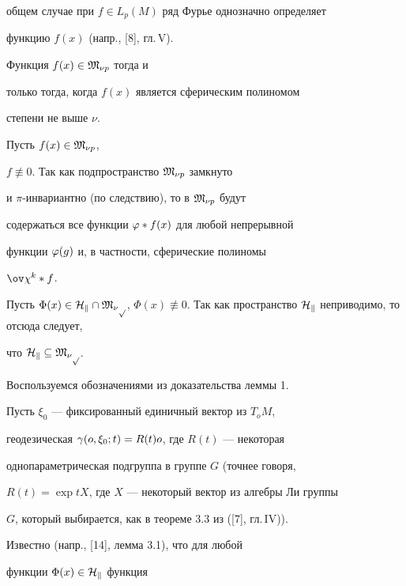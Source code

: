общем случае при $f\in L_p(M)$ ряд Фурье однозначно определяет


функцию $f(x)$ (напр., [8], гл.\,V).





\begin{thm}


Функция $f(x)\in\frak M_{\nu p}$ тогда и


только тогда, когда $f(x)$ является сферическим полиномом


степени не выше $\nu$.


\end{thm}





\begin{pf}


Пусть $f(x)\in\frak M_{\nu p}$,


$f\not\equiv 0$. Так как подпространство $\frak M_{\nu p}$ замкнуто


и $\pi$-инвариантно (по следствию), то в $\frak M_{\nu p}$ будут


содержаться все функции $\varphi*f(x)$ для любой непрерывной


функции $\varphi(g)$ и, в частности, сферические полиномы


$\ov\chi{}^k*f$.





Пусть $\Phi(x)\in\Hc_k\cap\Mg_{\nu p}$, $\Phi(x)\not\equiv


0$. Так как пространство $\Hc_k$ неприводимо, то отсюда следует,


что $\cal H_k\subseteq\frak M_{\nu p}$.





Воспользуемся обозначениями из доказательства леммы 1.


Пусть $\xi_0$ --- фиксированный единичный вектор из $T_oM$,


геодезическая $\gamma(o,\xi_0;t)=R(t)o$, где $R(t)$ --- некоторая


однопараметрическая подгруппа в группе $G$ (точнее говоря,


$R(t)=\exp tX$, где $X$ --- некоторый вектор из алгебры Ли группы


$G$, который выбирается, как в теореме 3.3 из ([7], гл.\,IV)).


Известно (напр., [14], лемма 3.1), что для любой


функции $\Phi(x)\in\cal H_k$ функция



\end{pf}
